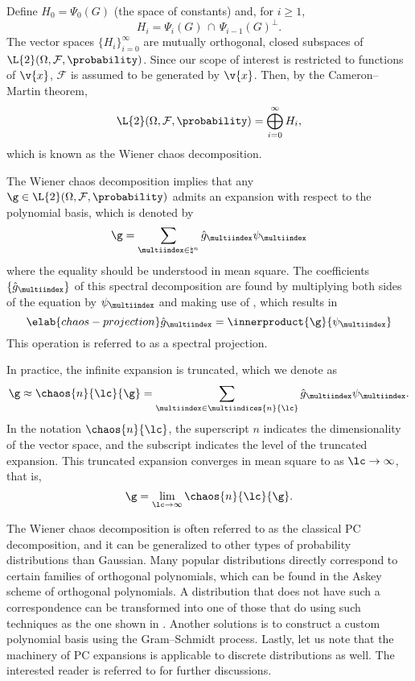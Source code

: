 Define $H_0 = \Psi_0(G)$ (the space of constants) and, for $i \geq 1$,
\[
  H_i = \Psi_i(G) \, \cap \, \Psi_{i - 1}(G)^\perp.
\]
The vector spaces $\{ H_i \}_{i = 0}^\infty$ are mutually orthogonal, closed
subspaces of $\L{2}(\Omega, \mathcal{F}, \probability)$. Since our scope of
interest is restricted to functions of $\v{x}$, $\mathcal{F}$ is assumed to be
generated by $\v{x}$. Then, by the Cameron--Martin theorem,
\[
  \L{2}(\Omega, \mathcal{F}, \probability) = \bigoplus_{i = 0}^\infty H_i,
\]
which is known as the Wiener chaos decomposition.

The Wiener chaos decomposition implies that any $\g \in \L{2}(\Omega,
\mathcal{F}, \probability)$ admits an expansion with respect to the polynomial
basis, which is denoted by
\[
  \g = \sum_{\multiindex \in \natural^n} \hat{g}_{\multiindex} \psi_{\multiindex}
\]
where the equality should be understood in mean square. The coefficients $\{
\hat{g}_{\multiindex} \}$ of this spectral decomposition are found by
multiplying both sides of the equation by $\psi_{\multiindex}$ and making use of
, which results in
\begin{equation} \elab{chaos-projection}
  \hat{g}_{\multiindex} = \innerproduct{\g}{\psi_{\multiindex}}
\end{equation}
This operation is referred to as a spectral projection.

In practice, the infinite expansion is truncated, which we denote as
\[
  \g \approx \chaos{n}{\lc}{\g} = \sum_{\multiindex \in \multiindices{n}{\lc}} \hat{g}_{\multiindex} \psi_{\multiindex}.
\]
In the notation $\chaos{n}{\lc}$, the superscript $n$ indicates the
dimensionality of the vector space, and the subscript \lc indicates the level of
the truncated expansion. This truncated expansion converges in mean square to \g
as $\lc \to \infty$, that is,
\[
  \g = \lim_{\lc \to \infty} \chaos{n}{\lc}{\g}.
\]

The Wiener chaos decomposition is often referred to as the classical \acf{PC}
decomposition, and it can be generalized to other types of probability
distributions than Gaussian. Many popular distributions directly correspond to
certain families of orthogonal polynomials, which can be found in the Askey
scheme of orthogonal polynomials. A distribution that does not have such a
correspondence can be transformed into one of those that do using such
techniques as the one shown in . Another
solutions is to construct a custom polynomial basis using the Gram--Schmidt
process. Lastly, let us note that the machinery of \ac{PC} expansions is
applicable to discrete distributions as well. The interested reader is referred
to \cite{xiu2010} for further discussions.
